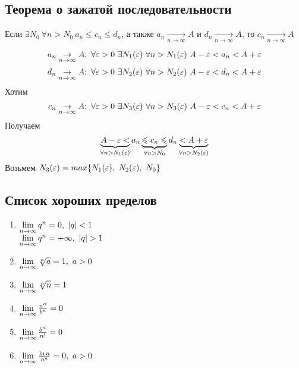 \subsection{Теорема о зажатой последовательности}
\begin{theorem}
    Если $\exists N_0\ \forall n > N_0\ a_n \leq c_n \leq d_n$, а также $a_n \underset{n \to \infty}{\to} A$ и $d_n \underset{n \to \infty}{\to} A$, то $c_n \underset{n \to \infty}{\to} A$
\end{theorem}

\begin{Proof}
    $$a_n \underset{n \to \infty}{\to} A;\ \forall \eps > 0\ \exists N_1(\eps)\ \forall n > N_1(\eps)\ A-\eps < a_n < A+\eps$$
    $$d_n \underset{n \to \infty}{\to} A;\ \forall \eps > 0\ \exists N_2(\eps)\ \forall n > N_2(\eps)\ A-\eps < d_n < A+\eps$$
    Хотим
    $$c_n \underset{n \to \infty}{\to} A;\ \forall \eps > 0\ \exists N_3(\eps)\ \forall n > N_3(\eps)\ A-\eps < c_n < A+\eps$$
    Получаем
    $$ \underbrace{A-\varepsilon <}_{\forall n > N_1(\varepsilon)} a_n \underbrace{\leqslant c_n \leqslant}_{\forall n > N_0} d_n \underbrace{< A+\varepsilon}_{\forall n > N_2(\varepsilon)} $$
    Возьмем $N_3(\eps) = max\{N_1(\eps),\ N_2(\eps),\ N_0\}$
\end{Proof}

\subsection{Список хороших пределов}
\begin{enumerate}
    \item $\lim\limits_{n \to \infty} q^n = 0,\ |q| < 1$\\
    $\lim\limits_{n \to \infty} q^n = +\infty,\ |q| > 1$
    \item $\lim\limits_{n \to \infty} \sqrt[n]{a} = 1,\ a > 0$
    \item $\lim\limits_{n \to \infty} \sqrt[n]{n} = 1$
    \item $\lim\limits_{n \to \infty} \frac{n^a}{b^n} = 0$
    \item $\lim\limits_{n \to \infty} \frac{b^n}{n!} = 0$
    \item $\lim\limits_{n \to \infty} \frac{\ln{n}}{n^a} = 0,\ a > 0$
\end{enumerate}
